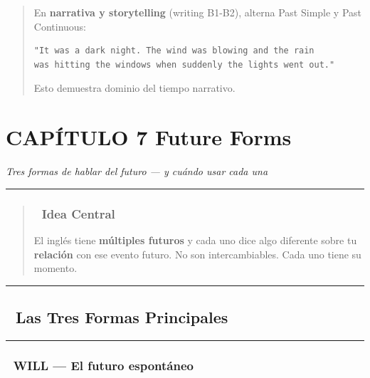\documentclass[
  spanish,
  letterpaper,
]{scrbook}
\begin{document}
\begin{quote}
En \textbf{narrativa y storytelling} (writing B1-B2), alterna Past
Simple y Past Continuous:

\begin{verbatim}
"It was a dark night. The wind was blowing and the rain
was hitting the windows when suddenly the lights went out."
\end{verbatim}

Esto demuestra dominio del tiempo narrativo.
\end{quote}

\chapter{CAPÍTULO 7 Future Forms}\label{capuxedtulo-7-future-forms}

\emph{Tres formas de hablar del futuro --- y cuándo usar cada una}

\begin{center}\rule{0.5\linewidth}{0.5pt}\end{center}

\begin{quote}
\subsection{🎯 Idea Central}\label{idea-central-5}

El inglés tiene \textbf{múltiples futuros} y cada uno dice algo
diferente sobre tu \textbf{relación} con ese evento futuro. No son
intercambiables. Cada uno tiene su momento.
\end{quote}

\begin{center}\rule{0.5\linewidth}{0.5pt}\end{center}

\section{📐 Las Tres Formas
Principales}\label{las-tres-formas-principales}

\begin{center}\rule{0.5\linewidth}{0.5pt}\end{center}

\subsection{🔮 WILL --- El futuro
espontáneo}\label{will-el-futuro-espontuxe1neo}
\end{document}

